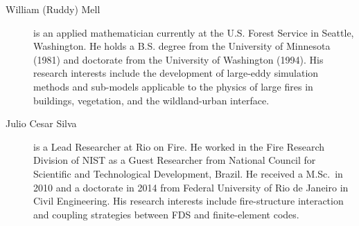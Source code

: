 \begin{description}
\item[William (Ruddy) Mell] is an applied mathematician currently at the U.S. Forest Service in Seattle, Washington. He holds a B.S. degree from the University of Minnesota (1981) and doctorate from the University of Washington (1994). His research interests include the development of large-eddy simulation methods and sub-models applicable to the physics of large fires in buildings, vegetation, and the wildland-urban interface.




\item[Julio Cesar Silva] is a Lead Researcher at Rio on Fire. He worked in the Fire Research Division of NIST as a Guest Researcher from National Council for Scientific and Technological Development, Brazil. He received a M.Sc.~in 2010 and a doctorate in 2014 from Federal University of Rio de Janeiro in Civil Engineering. His research interests include fire-structure interaction and coupling strategies between FDS and finite-element codes.


\end{description}
